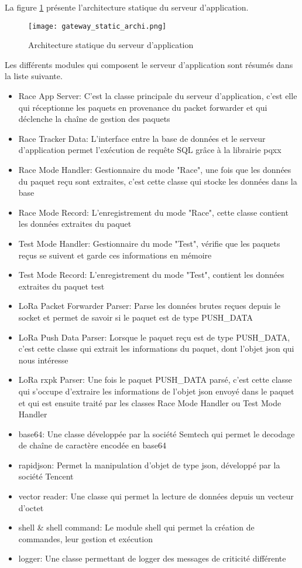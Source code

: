 La figure \ref{fig:gateway_static_archi} présente l'architecture statique du serveur d'application.

\begin{figure}[htb]
\centering 
\texttt{[image: gateway\_static\_archi.png]} 
\caption{Architecture statique du serveur d'application}
\label{fig:gateway_static_archi}
\end{figure}

Les différents modules qui composent le serveur d'application sont résumés dans la liste suivante.

\begin{itemize}
\item Race App Server: C'est la classe principale du serveur d'application, c'est elle qui réceptionne les paquets en provenance du packet forwarder et qui déclenche la chaîne de gestion des paquets
\item Race Tracker Data: L'interface entre la base de données et le serveur d'application permet l'exécution de requête SQL grâce à la librairie pqxx
\item Race Mode Handler: Gestionnaire du mode "Race", une fois que les données du paquet reçu sont extraites, c'est cette classe qui stocke les données dans la base
\item Race Mode Record: L'enregistrement du mode "Race", cette classe contient les données extraites du paquet
\item Test Mode Handler: Gestionnaire du mode "Test", vérifie que les paquets reçus se suivent et garde ces informations en mémoire
\item Test Mode Record: L'enregistrement du mode "Test", contient les données extraites du paquet test
\item LoRa Packet Forwarder Parser: Parse les données brutes reçues depuis le socket et permet de savoir si le paquet est de type PUSH\_DATA
\item LoRa Push Data Parser: Lorsque le paquet reçu est de type PUSH\_DATA, c'est cette classe qui extrait les informations du paquet, dont l'objet json qui nous intéresse
\item LoRa rxpk Parser: Une fois le paquet PUSH\_DATA parsé, c'est cette classe qui s'occupe d'extraire les informations de l'objet json envoyé dans le paquet et qui est ensuite traité par les classes Race Mode Handler ou Test Mode Handler
\item base64: Une classe développée par la société Semtech qui permet le decodage de chaîne de caractère encodée en base64
\item rapidjson: Permet la manipulation d'objet de type json, développé par la société Tencent
\item vector reader: Une classe qui permet la lecture de données depuis un vecteur d'octet
\item shell \& shell command: Le module shell qui permet la création de commandes, leur gestion et exécution
\item logger: Une classe permettant de logger des messages de criticité différente
\end{itemize}

